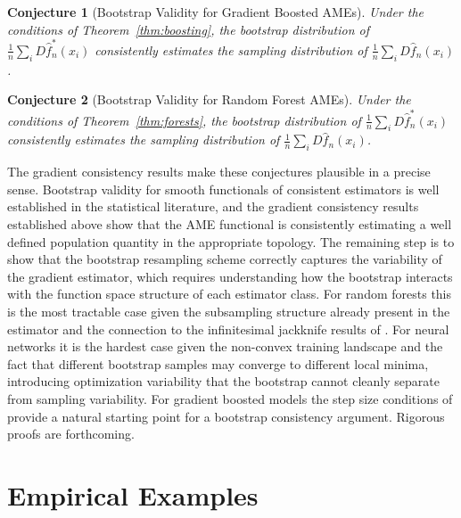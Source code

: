 \documentclass[12pt]{article}
\newtheorem{conjecture}{Conjecture}
\newcommand{\fn}{\hat{f}_n}
\begin{document}
	\begin{conjecture}[Bootstrap Validity for Gradient Boosted AMEs]
		\label{conj:bootstrap_boost}
		Under the conditions of Theorem~\ref{thm:boosting}, the bootstrap distribution of
		$\frac{1}{n}\sum_i D\hat{f}_n^*(x_i)$ consistently estimates the sampling
		distribution of $\frac{1}{n}\sum_i D\fn(x_i)$.
	\end{conjecture}
	
	\begin{conjecture}[Bootstrap Validity for Random Forest AMEs]
		\label{conj:bootstrap_rf}
		Under the conditions of Theorem~\ref{thm:forests}, the bootstrap distribution of
		$\frac{1}{n}\sum_i D\hat{f}_n^*(x_i)$ consistently estimates the sampling
		distribution of $\frac{1}{n}\sum_i D\fn(x_i)$.
	\end{conjecture}
	
	The gradient consistency results make these conjectures plausible in a precise sense. Bootstrap validity for smooth functionals of consistent estimators is well established in the statistical literature, and the gradient consistency results established above show that the AME functional is consistently estimating a well defined population quantity in the appropriate topology. The remaining step is to show that the bootstrap resampling scheme correctly captures the variability of the gradient estimator, which requires understanding how the bootstrap interacts with the function space structure of each estimator class. For random forests this is the most tractable case given the subsampling structure already present in the estimator and the connection to the infinitesimal jackknife results of \citet{wager2014confidence}. For neural networks it is the hardest case given the non-convex training landscape and the fact that different bootstrap samples may converge to different local minima, introducing optimization variability that the bootstrap cannot cleanly separate from sampling variability. For gradient boosted models the step size conditions of \citet{buhlmann2003boosting} provide a natural starting point for a bootstrap consistency argument. Rigorous proofs are forthcoming.
	
	\section{Empirical Examples}
	
\end{document}
